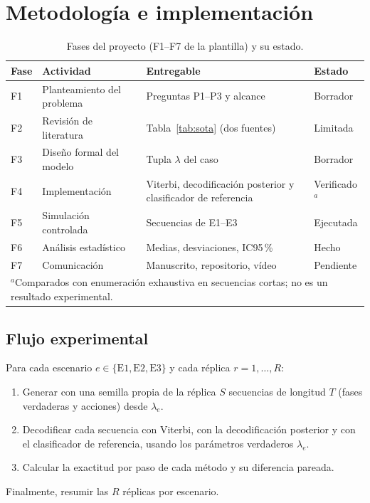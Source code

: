 \documentclass[11pt,a4paper]{article}
\begin{document}
\section{Metodología e implementación}

\begin{table}[ht]
\centering
\caption{Fases del proyecto (F1--F7 de la plantilla) y su estado.}
\small
\begin{tabularx}{\textwidth}{l>{\raggedright\arraybackslash}X>{\raggedright\arraybackslash}X l}
\toprule
Fase & Actividad & Entregable & Estado \\
\midrule
F1 & Planteamiento del problema & Preguntas P1--P3 y alcance & Borrador \\
F2 & Revisión de literatura & Tabla~\ref{tab:sota} (dos fuentes) & Limitada \\
F3 & Diseño formal del modelo & Tupla $\lambda$ del caso & Borrador \\
F4 & Implementación & Viterbi, decodificación posterior y clasificador de referencia & Verificado$^{a}$ \\
F5 & Simulación controlada & Secuencias de E1--E3 & Ejecutada \\
F6 & Análisis estadístico & Medias, desviaciones, IC95\,\% & Hecho \\
F7 & Comunicación & Manuscrito, repositorio, vídeo & Pendiente \\
\bottomrule
\multicolumn{4}{l}{\footnotesize $^{a}$Comparados con enumeración exhaustiva en
secuencias cortas; no es un resultado experimental.}
\end{tabularx}
\end{table}

\subsection{Flujo experimental}
Para cada escenario $e\in\{\mathrm{E1},\mathrm{E2},\mathrm{E3}\}$ y cada
réplica $r=1,\dots,R$:
\begin{enumerate}
\item Generar con una semilla propia de la réplica $S$ secuencias de longitud
$T$ (fases verdaderas y acciones) desde $\lambda_e$.
\item Decodificar cada secuencia con Viterbi, con la decodificación posterior y
con el clasificador de referencia, usando los parámetros verdaderos $\lambda_e$.
\item Calcular la exactitud por paso de cada método y su diferencia pareada.
\end{enumerate}
Finalmente, resumir las $R$ réplicas por escenario.
\end{document}
